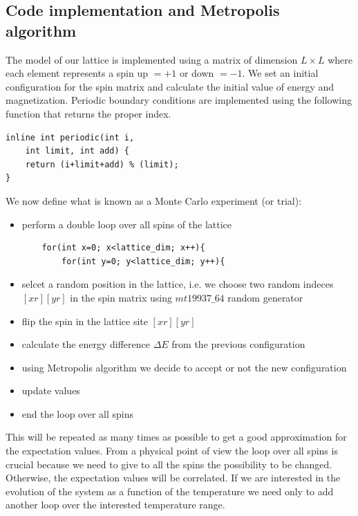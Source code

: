 \documentclass[%
preprint,
 amsmath,amssymb,
 aps,
]{revtex4-1}
\theoremstyle{plain}
\theoremstyle{definition}
\theoremstyle{plain}
\begin{document}
\subsection{Code implementation and Metropolis algorithm}
The model of our lattice is implemented using a matrix of dimension $L \times L$ where each element represents a spin up $=+1$ or down $=-1$.
We set an initial configuration for the spin matrix and calculate the initial value of energy and magnetization. Periodic boundary conditions are implemented using the following function that returns the proper index.
\lstset{numbers=none, numberstyle=\tiny, stepnumber=2, numbersep=5pt}
\begin{lstlisting}
inline int periodic(int i, 
    int limit, int add) {
    return (i+limit+add) % (limit);
}
\end{lstlisting}
We now define what is known as a Monte Carlo experiment (or trial):
\begin{itemize}
\item perform a double loop over all spins of the lattice 
\lstset{numbers=none, numberstyle=\tiny, stepnumber=2, numbersep=5pt}
\begin{lstlisting}
    for(int x=0; x<lattice_dim; x++){
        for(int y=0; y<lattice_dim; y++){
\end{lstlisting}
\item selcet a random position in the lattice, i.e. we choose two random indeces $[xr][yr]$ in the spin matrix using $mt19937\_64$ random generator
\item flip the spin in the lattice site $[xr][yr]$
\item calculate the energy difference $\Delta E$ from the previous configuration
\item using Metropolis algorithm we decide to accept or not the new configuration
\item update values

\item end the loop over all spins

\end{itemize}
This will be repeated as many times as possible to get a good approximation for the expectation values. From a physical point of view the loop over all spins is crucial because we need to give to all the spins the possibility to be changed. Otherwise, the expectation values will be correlated. If we are interested in the evolution of the system as a function of the temperature we need only to add another loop over the interested temperature range.\\
\end{document}
